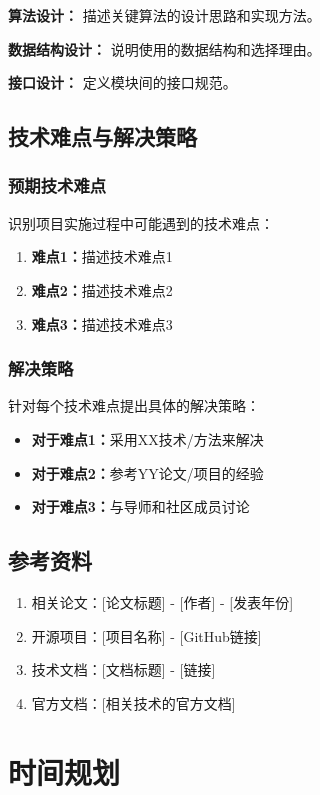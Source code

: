 \documentclass[a4paper,12pt]{article}
\begin{document}
\textbf{算法设计：}
描述关键算法的设计思路和实现方法。

\textbf{数据结构设计：}
说明使用的数据结构和选择理由。

\textbf{接口设计：}
定义模块间的接口规范。

\subsection{技术难点与解决策略}

\subsubsection{预期技术难点}
识别项目实施过程中可能遇到的技术难点：
\begin{enumerate}
    \item \textbf{难点1：}描述技术难点1
    \item \textbf{难点2：}描述技术难点2
    \item \textbf{难点3：}描述技术难点3
\end{enumerate}

\subsubsection{解决策略}
针对每个技术难点提出具体的解决策略：
\begin{itemize}
    \item \textbf{对于难点1：}采用XX技术/方法来解决
    \item \textbf{对于难点2：}参考YY论文/项目的经验
    \item \textbf{对于难点3：}与导师和社区成员讨论
\end{itemize}

\subsection{参考资料}

\begin{enumerate}
    \item 相关论文：[论文标题] - [作者] - [发表年份]
    \item 开源项目：[项目名称] - [GitHub链接]
    \item 技术文档：[文档标题] - [链接]
    \item 官方文档：[相关技术的官方文档]
\end{enumerate}

\section{时间规划}
\end{document}
